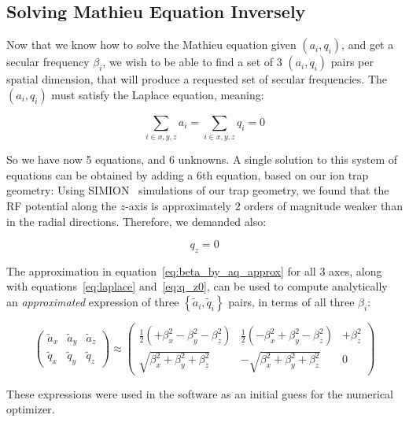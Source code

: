 \subsection{Solving Mathieu Equation Inversely}\label{sec:theory/mathieu-inversly}

Now that we know how to solve the Mathieu equation given $(a_i, q_i)$, and get a secular frequency $\beta_i$, we wish to be able to find a set of 3 $(a_i, q_i)$ pairs per spatial dimension, that will produce a requested set of secular frequencies. The $(a_i, q_i)$ must satisfy the Laplace equation, meaning:

\begin{equation}
    \sum_{i\in{x,y,z}} a_i = \sum_{i\in{x,y,z}} q_i = 0
    \label{eq:laplace}
\end{equation}

So we have now 5 equations, and 6 unknowns. A single solution to this system of equations can be obtained by adding a 6th equation, based on our ion trap geometry: Using SIMION~\cite{SIMION} simulations of our trap geometry, we found that the RF potential along the $z$-axis is approximately $2$ orders of magnitude weaker than in the radial directions. Therefore, we demanded also:

\begin{equation}
    q_z = 0
    \label{eq:q_z0}
\end{equation}

The approximation in equation~\ref{eq:beta_by_aq_approx} for all 3 axes, along with equations~\ref{eq:laplace} and~\ref{eq:q_z0}, can be used to compute analytically an \emph{approximated} expression of three $\left\{\tilde{a}_i, \tilde{q}_i\right\}$ pairs, in terms of all three $\beta_i$:

\begin{equation}
\begin{pmatrix}
\tilde{a}_x & \tilde{a}_y & \tilde{a}_z \\
\tilde{q}_x & \tilde{q}_y & \tilde{q}_z
\end{pmatrix}
\approx
\begin{pmatrix}
\frac{1}{2}\left( +\beta_x^2 - \beta_y^2 - \beta_z^2 \right) &
\frac{1}{2}\left( -\beta_x^2 + \beta_y^2 - \beta_z^2 \right) &
+\beta_z^2
\\
\sqrt{\beta_x^2 + \beta_y^2 + \beta_z^2} &
-\sqrt{\beta_x^2 + \beta_y^2 + \beta_z^2} &
0
\end{pmatrix}
\end{equation}

These expressions were used in the software as an initial guess for the numerical optimizer.

